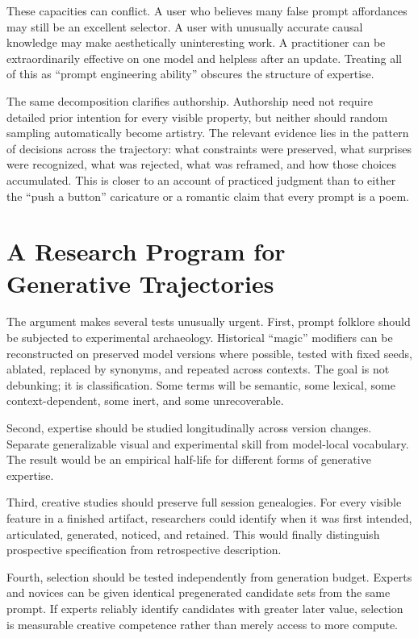 \documentclass[11pt]{article}
\begin{document}
These capacities can conflict. A user who believes many false prompt affordances may still be an excellent selector. A user with unusually accurate causal knowledge may make aesthetically uninteresting work. A practitioner can be extraordinarily effective on one model and helpless after an update. Treating all of this as ``prompt engineering ability'' obscures the structure of expertise.

The same decomposition clarifies authorship. Authorship need not require detailed prior intention for every visible property, but neither should random sampling automatically become artistry. The relevant evidence lies in the pattern of decisions across the trajectory: what constraints were preserved, what surprises were recognized, what was rejected, what was reframed, and how those choices accumulated. This is closer to an account of practiced judgment than to either the ``push a button'' caricature or a romantic claim that every prompt is a poem.

\section{A Research Program for Generative Trajectories}

The argument makes several tests unusually urgent. First, prompt folklore should be subjected to experimental archaeology. Historical ``magic'' modifiers can be reconstructed on preserved model versions where possible, tested with fixed seeds, ablated, replaced by synonyms, and repeated across contexts. The goal is not debunking; it is classification. Some terms will be semantic, some lexical, some context-dependent, some inert, and some unrecoverable.

Second, expertise should be studied longitudinally across version changes. Separate generalizable visual and experimental skill from model-local vocabulary. The result would be an empirical half-life for different forms of generative expertise.

Third, creative studies should preserve full session genealogies. For every visible feature in a finished artifact, researchers could identify when it was first intended, articulated, generated, noticed, and retained. This would finally distinguish prospective specification from retrospective description.

Fourth, selection should be tested independently from generation budget. Experts and novices can be given identical pregenerated candidate sets from the same prompt. If experts reliably identify candidates with greater later value, selection is measurable creative competence rather than merely access to more compute.
\end{document}
